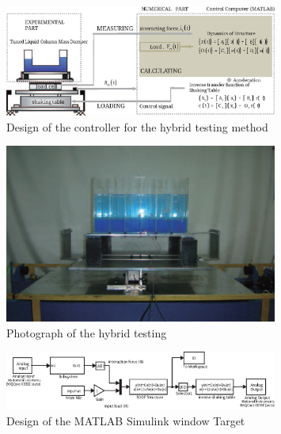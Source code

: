 \begin{figure}[ht]
\centering
\includegraphics[width=0.8\textwidth] {figure/5-16.eps}
\caption{Design of the controller for the hybrid testing method}
\label{fig:5-16}
\end{figure}

\begin{figure}[ht]
\centering
\includegraphics[width=0.8\textwidth] {figure/5-17.eps}
\caption{Photograph of the hybrid testing}
\label{fig:5-17}
\end{figure}

\begin{figure}[ht]
\centering
\includegraphics[width=0.8\textwidth] {figure/5-18.eps}
\caption{Design of the MATLAB Simulink window Target}
\label{fig:5-18}
\end{figure}








\clearpage

